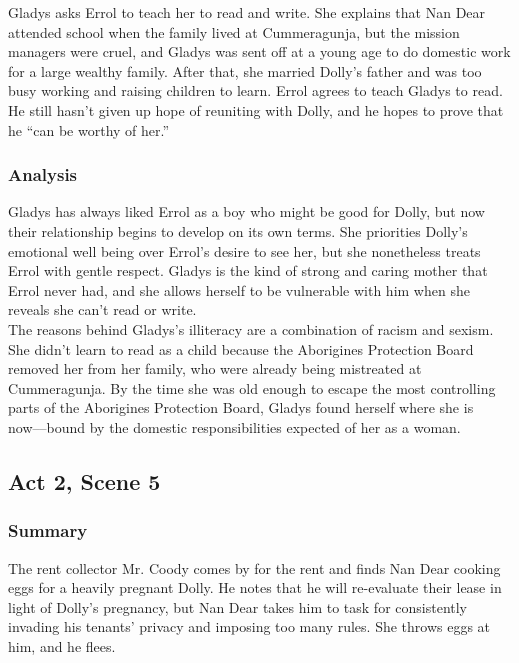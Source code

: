 \documentclass[a4paper]{article}
\begin{document}
Gladys asks Errol to teach her to read and write. She explains
that Nan Dear attended school when the family lived at
Cummeragunja, but the mission managers were cruel, and
Gladys was sent off at a young age to do domestic work for a
large wealthy family. After that, she married Dolly’s father and
was too busy working and raising children to learn. Errol agrees
to teach Gladys to read. He still hasn’t given up hope of
reuniting with Dolly, and he hopes to prove that he “can be
worthy of her.”\\

\subsubsection{Analysis}
Gladys has always liked Errol as a boy who might be good for Dolly,
but now their relationship begins to develop on its own terms. She
priorities Dolly’s emotional well being over Errol’s desire to see her,
but she nonetheless treats Errol with gentle respect. Gladys is the
kind of strong and caring mother that Errol never had, and she
allows herself to be vulnerable with him when she reveals she can’t
read or write.\\

The reasons behind Gladys’s illiteracy are a combination of racism
and sexism. She didn’t learn to read as a child because the
Aborigines Protection Board removed her from her family, who were
already being mistreated at Cummeragunja. By the time she was old
enough to escape the most controlling parts of the Aborigines
Protection Board, Gladys found herself where she is now––bound
by the domestic responsibilities expected of her as a woman.\\


\subsection{Act 2, Scene 5}
\subsubsection{Summary}
The rent collector Mr. Coody comes by for the rent and finds
Nan Dear cooking eggs for a heavily pregnant Dolly. He notes
that he will re-evaluate their lease in light of Dolly’s pregnancy,
but Nan Dear takes him to task for consistently invading his
tenants’ privacy and imposing too many rules. She throws eggs
at him, and he flees.\\
\end{document}
